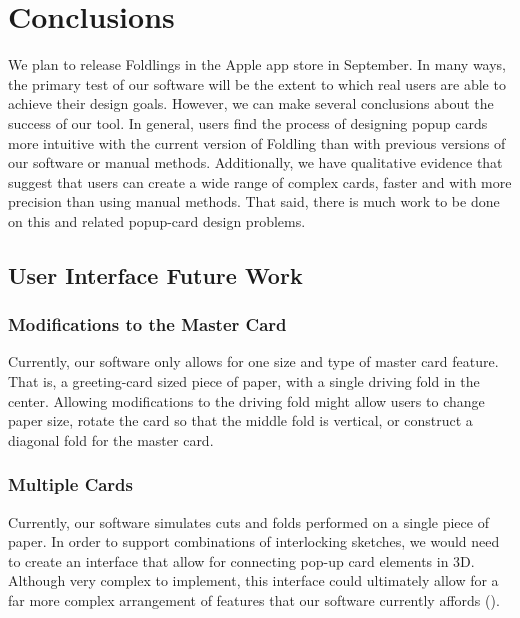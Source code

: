 \chapter{Conclusions}

We plan to release Foldlings in the Apple app store in September. In
many ways, the primary test of our software will be the extent to which
real users are able to achieve their design goals. However, we can make
several conclusions about the success of our tool. In general, users
find the process of designing popup cards more intuitive with the
current version of Foldling than with previous versions of our software
or manual methods. Additionally, we have qualitative evidence that
suggest that users can create a wide range of complex cards, faster and
with more precision than using manual methods. That said, there is much
work to be done on this and related popup-card design problems.

\section{User Interface Future Work}\label{user-interface-future-work}

\subsection{Modifications to the Master
Card}\label{modifications-to-the-master-card}

Currently, our software only allows for one size and type of master card
feature. That is, a greeting-card sized piece of paper, with a single
driving fold in the center. Allowing modifications to the driving fold
might allow users to change paper size, rotate the card so that the
middle fold is vertical, or construct a diagonal fold for the master
card.

\subsection{Multiple Cards}\label{multiple-cards}

Currently, our software simulates cuts and folds performed on a single
piece of paper. In order to support combinations of interlocking
sketches, we would need to create an interface that allow for connecting
pop-up card elements in 3D. Although very complex to implement, this
interface could ultimately allow for a far more complex arrangement of
features that our software currently affords (\citet{hart2007modular}).

